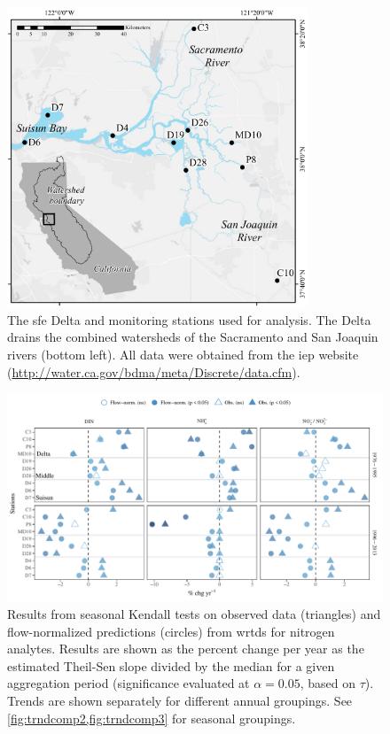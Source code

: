 \documentclass[journal = esthag, manuscript = article]{achemso}\usepackage[]{graphicx}\usepackage[]{color}
\begin{document}
\begin{singlespace}

\end{singlespace}

\begin{figure}
\centering
\includegraphics[width=0.8\textwidth,page=1]{figs/delt_map.pdf}
\caption{The \acl{sfe} Delta and monitoring stations used for analysis. The Delta drains the combined watersheds of the Sacramento and San Joaquin rivers (bottom left). All data were obtained from the \acl{iep} website (\url{http://water.ca.gov/bdma/meta/Discrete/data.cfm})\cite{IEP13}.}
\label{fig:delt_map}   
\end{figure}



\begin{figure}
\centering
\includegraphics[width=1\textwidth,page=1]{figs/trndcomp1.pdf}
\caption{Results from seasonal Kendall tests on observed data (triangles) and flow-normalized predictions (circles) from \ac{wrtds} for nitrogen analytes. Results are shown as the percent change per year as the estimated Theil-Sen slope divided by the median for a given aggregation period (significance evaluated at $\alpha = 0.05$, based on $\tau$). Trends are shown separately for different annual groupings. See \cref{fig:trndcomp2,fig:trndcomp3} for seasonal groupings.}
\label{fig:trndcomp1}   
\end{figure}
\end{document}
